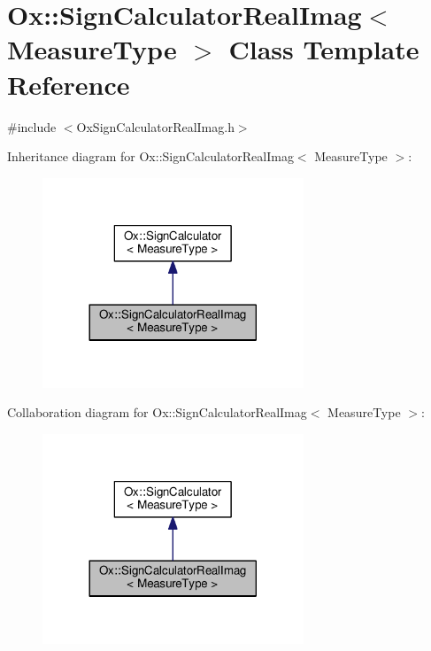 \hypertarget{class_ox_1_1_sign_calculator_real_imag}{}\section{Ox\+:\+:Sign\+Calculator\+Real\+Imag$<$ Measure\+Type $>$ Class Template Reference}
\label{class_ox_1_1_sign_calculator_real_imag}


{\ttfamily \#include $<$Ox\+Sign\+Calculator\+Real\+Imag.\+h$>$}



Inheritance diagram for Ox\+:\+:Sign\+Calculator\+Real\+Imag$<$ Measure\+Type $>$\+:
\nopagebreak
\begin{figure}[H]
\begin{center}
\leavevmode
\includegraphics[width=221pt]{class_ox_1_1_sign_calculator_real_imag__inherit__graph}
\end{center}
\end{figure}


Collaboration diagram for Ox\+:\+:Sign\+Calculator\+Real\+Imag$<$ Measure\+Type $>$\+:
\nopagebreak
\begin{figure}[H]
\begin{center}
\leavevmode
\includegraphics[width=221pt]{class_ox_1_1_sign_calculator_real_imag__coll__graph}
\end{center}
\end{figure}
